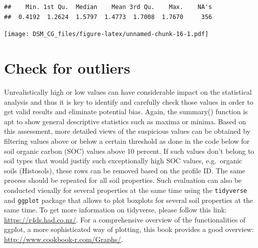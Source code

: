\documentclass[
  10pt,
  b5paper,
  oneside]{book}
\newenvironment{Shaded}{\begin{snugshade}}{\end{snugshade}}
\newcommand{\AttributeTok}[1]{\textcolor[rgb]{0.77,0.63,0.00}{#1}}
\newcommand{\ConstantTok}[1]{\textcolor[rgb]{0.00,0.00,0.00}{#1}}
\newcommand{\DecValTok}[1]{\textcolor[rgb]{0.00,0.00,0.81}{#1}}
\newcommand{\FloatTok}[1]{\textcolor[rgb]{0.00,0.00,0.81}{#1}}
\newcommand{\FunctionTok}[1]{\textcolor[rgb]{0.00,0.00,0.00}{#1}}
\newcommand{\NormalTok}[1]{#1}
\newcommand{\SpecialCharTok}[1]{\textcolor[rgb]{0.00,0.00,0.00}{#1}}
\newcommand{\StringTok}[1]{\textcolor[rgb]{0.31,0.60,0.02}{#1}}
\begin{document}
\begin{verbatim}
##    Min. 1st Qu.  Median    Mean 3rd Qu.    Max.    NA's 
##  0.4192  1.2624  1.5797  1.4773  1.7008  1.7670     356
\end{verbatim}

\begin{Shaded}
\end{Shaded}

\texttt{[image: DSM\_CG\_files/figure-latex/unnamed-chunk-16-1.pdf]}

\hypertarget{check-for-outliers}{%
\section{Check for outliers}\label{check-for-outliers}}

Unrealistically high or low values can have considerable impact on the statistical analysis and thus it is key to identify and carefully check those values in order to get valid results and eliminate potential bias. Again, the summary() function is apt to show general descriptive statistics such as maxima or minima. Based on this assessment, more detailed views of the suspicious values can be obtained by filtering values above or below a certain threshold as done in the code below for soil organic carbon (SOC) values above 10 percent. If such values don't belong to soil types that would justify such exceptionally high SOC values, e.g.~organic soils (Histosols), these rows can be removed based on the profile ID. The same process should be repeated for all soil properties.
Such evaluation can also be conducted visually for several properties at the same time using the \texttt{tidyverse} and \texttt{ggplot} package that allows to plot boxplots for several soil properties at the same time. To get more information on tidyverse, please follow this link: \url{https://r4ds.had.co.nz/}. For a comprehensive overview of the functionalities of ggplot, a more sophisticated way of plotting, this book provides a good overview: \url{http://www.cookbook-r.com/Graphs/}.
\end{document}
